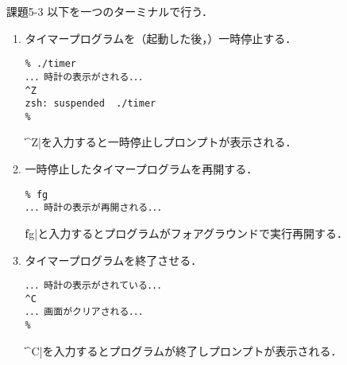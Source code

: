 \documentclass[a4j,twcolumn,11pt,nomag]{ltjarticle}      %
\begin{document}
\begin{itemize}
\begin{enumerate}
  \item タイマープログラムのSTATを再度確認
\lstset{basicstyle=\footnotesize\ttfamily}
\begin{lstlisting}
% ps u
USER       PID  %CPU %MEM      VSZ    RSS   TT  STAT STARTED      TIME COMMAND
sigemura 17026   0.3  0.0 408169504   3376 s000  S    10:28AM   0:00.11 -zsh
sigemura 17419   0.0  0.0 407972224    816 s001  T    11:04AM   0:00.10 ./timer
sigemura 17367   0.0  0.0 408300576   3376 s001  S+   11:02AM   0:00.09 -zsh
\end{lstlisting}
STATが\|T|（一時停止状態）に変化した．

  \item タイマープログラムを再開させる．
\lstset{basicstyle=\small\ttfamily}
\begin{lstlisting}
% kill -CONT 17419
\end{lstlisting}
もう一方のターミナルの時計表示が再開された．

  \item タイマープログラムを終了させる．
\begin{lstlisting}
% kill -INT 17419
\end{lstlisting}
「課題の準備」でタイマープログラムは\|^C|で画面を消して終了していた．
\|^C|と同じシグナルを送ると同じ終わり方をする．

  \end{enumerate}

\item[課題5-3] 以下を一つのターミナルで行う．
  \begin{enumerate}
  \item タイマープログラムを（起動した後，）一時停止する．
\begin{lstlisting}
% ./timer
．．．時計の表示がされる．．．
^Z
zsh: suspended  ./timer
% 
\end{lstlisting}
\|^Z|を入力すると一時停止しプロンプトが表示される．

  \item 一時停止したタイマープログラムを再開する．
\begin{lstlisting}
% fg
．．．時計の表示が再開される．．．
\end{lstlisting}
\|fg|と入力するとプログラムがフォアグラウンドで実行再開する．

  \item タイマープログラムを終了させる．
\begin{lstlisting}
．．．時計の表示がされている．．．
^C
．．．画面がクリアされる．．．
%
\end{lstlisting}
\|^C|を入力するとプログラムが終了しプロンプトが表示される．

  \end{enumerate}
\end{itemize}
\end{document}
